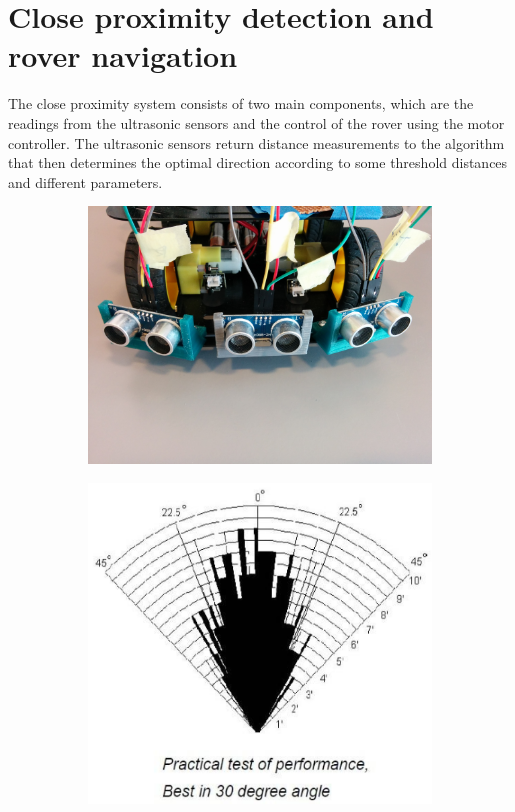 \clearpage
\section{Close proximity detection and\\ rover navigation}
The close proximity system consists of two main components, which are the readings from the ultrasonic sensors and the control of the rover using the motor controller.
The ultrasonic sensors return distance measurements to the algorithm that then determines the optimal direction according to some threshold distances and different parameters.

\begin{figure}[H]
	\centering
	\begin{subfigure}[H]{0.4\textwidth}
		\includegraphics[width=\textwidth]{images/mounted_ultrasonic_sensors.jpg}
	\end{subfigure}%
	\quad
	\begin{subfigure}[H]{0.4\textwidth}
		\includegraphics[width=\textwidth]{images/hcsr04angle.png}
	\end{subfigure}
\end{figure}
